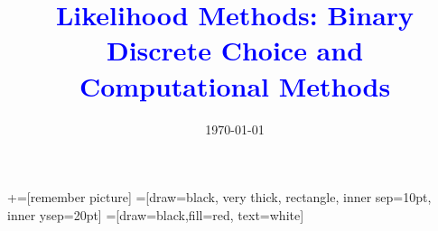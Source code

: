 \documentclass[notes,11pt, aspectratio=169]{beamer}
\title[]{\textcolor{blue}{Likelihood Methods: Binary Discrete Choice and Computational Methods}}
\author[PGP]{}
\institute[FRBNY]{\small{Paul Goldsmith-Pinkham}}
\date{\today}
\begin{document}
\newcommand\marktopleft[1]{%
    \tikz[overlay,remember picture] 
        \node (marker-#1-a) at (-.3em,.3em) {};%
}
\newcommand\markbottomright[2]{%
    \tikz[overlay,remember picture] 
        \node (marker-#1-b) at (0em,0em) {};%
}
+=[remember picture] 
 =[draw=black, very thick, rectangle, inner sep=10pt, inner ysep=20pt]
 =[draw=black,fill=red, text=white]

\begin{frame}
\maketitle

\end{frame}
\end{document}
